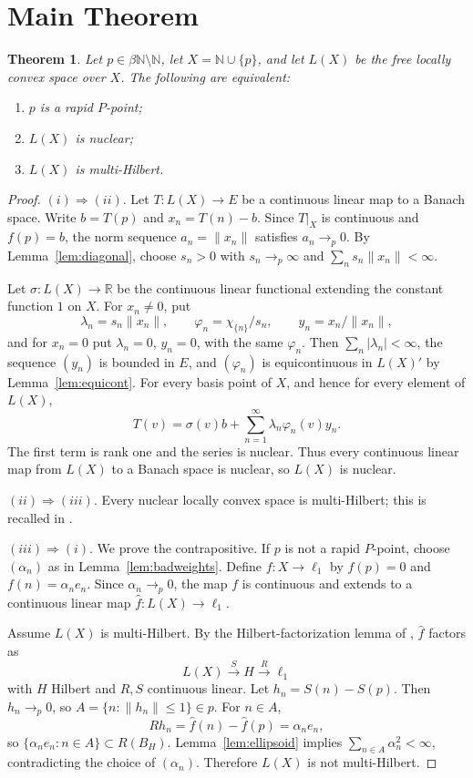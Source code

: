 \documentclass[11pt]{article}
\newtheorem{theorem}{Theorem}
\newcommand{\N}{\mathbb N}
\newcommand{\R}{\mathbb R}
\begin{document}
\section*{Main Theorem}

\begin{theorem}\label{thm:main}
Let \(p\in\beta\N\setminus\N\), let \(X=\N\cup\{p\}\), and let \(L(X)\) be the
free locally convex space over \(X\). The following are equivalent:
\begin{enumerate}[label=(\roman*)]
\item \(p\) is a rapid \(P\)-point;
\item \(L(X)\) is nuclear;
\item \(L(X)\) is multi-Hilbert.
\end{enumerate}
\end{theorem}

\begin{proof}
\((i)\Rightarrow(ii)\). Let \(T:L(X)\to E\) be a continuous linear map to a
Banach space. Write \(b=T(p)\) and \(x_n=T(n)-b\). Since \(T|_X\) is continuous
and \(f(p)=b\), the norm sequence \(a_n=\|x_n\|\) satisfies \(a_n\to_p0\).
By Lemma~\ref{lem:diagonal}, choose \(s_n>0\) with \(s_n\to_p\infty\) and
\(\sum_n s_n\|x_n\|<\infty\).

Let \(\sigma:L(X)\to\R\) be the continuous linear functional extending the
constant function \(1\) on \(X\). For \(x_n\ne0\), put
\[
   \lambda_n=s_n\|x_n\|,\qquad
   \varphi_n=\chi_{\{n\}}/s_n,\qquad
   y_n=x_n/\|x_n\|,
\]
and for \(x_n=0\) put \(\lambda_n=0\), \(y_n=0\), with the same
\(\varphi_n\). Then \(\sum_n|\lambda_n|<\infty\), the sequence \((y_n)\) is
bounded in \(E\), and \((\varphi_n)\) is equicontinuous in \(L(X)'\) by
Lemma~\ref{lem:equicont}. For every basis point of \(X\), and hence for every
element of \(L(X)\),
\[
   T(v)=\sigma(v)b+\sum_{n=1}^\infty \lambda_n\varphi_n(v)y_n .
\]
The first term is rank one and the series is nuclear. Thus every continuous
linear map from \(L(X)\) to a Banach space is nuclear, so \(L(X)\) is nuclear.

\((ii)\Rightarrow(iii)\). Every nuclear locally convex space is multi-Hilbert;
this is recalled in \cite[Section 2]{LU}.

\((iii)\Rightarrow(i)\). We prove the contrapositive. If \(p\) is not a rapid
\(P\)-point, choose \((\alpha_n)\) as in Lemma~\ref{lem:badweights}. Define
\(f:X\to\ell_1\) by \(f(p)=0\) and \(f(n)=\alpha_n e_n\). Since
\(\alpha_n\to_p0\), the map \(f\) is continuous and extends to a continuous
linear map \(\widehat f:L(X)\to\ell_1\).

Assume \(L(X)\) is multi-Hilbert. By the Hilbert-factorization lemma of
\cite[Lemma 2.4]{LU}, \(\widehat f\) factors as
\[
   L(X)\xrightarrow{S}H\xrightarrow{R}\ell_1
\]
with \(H\) Hilbert and \(R,S\) continuous linear. Let \(h_n=S(n)-S(p)\). Then
\(h_n\to_p0\), so \(A=\{n:\|h_n\|\le1\}\in p\). For \(n\in A\),
\[
   R h_n=\widehat f(n)-\widehat f(p)=\alpha_n e_n,
\]
so \(\{\alpha_n e_n:n\in A\}\subset R(B_H)\). Lemma~\ref{lem:ellipsoid}
implies \(\sum_{n\in A}\alpha_n^2<\infty\), contradicting the choice of
\((\alpha_n)\). Therefore \(L(X)\) is not multi-Hilbert.
\end{proof}
\end{document}
